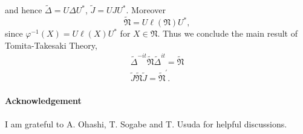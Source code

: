 \documentclass{article}
\begin{document}
and hence $\tilde{\Delta}=U\Delta U^\ast$, $\tilde{J}=UJU^\ast$.
Moreover  
$$
\tilde{\mathfrak{N}}=U\ell(\mathfrak{N})U^\ast,
$$
since $\varphi^{-1}(X)=U\ell (X) U^\ast$ for $X\in \mathfrak{N}$.
Thus we conclude the main result of Tomita-Takesaki Theory,
\begin{equation}
\begin{split}
\tilde{\Delta}^{-it}\tilde{\mathfrak{N}}\tilde{\Delta}^{it}=\tilde{\mathfrak{N}}\\
\tilde{J}\tilde{\mathfrak{N}}\tilde{J}=\tilde{\mathfrak{N}}^\prime.
\end{split}
\end{equation}




\paragraph{Acknowledgement}\label{acknowledgement}

I am grateful to A. Ohashi, T. Sogabe and T. Usuda for helpful
discussions.


\end{document}

